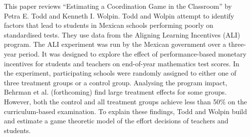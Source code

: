 
This paper reviews “Estimating a Coordination Game in the Classroom” by Petra E. Todd and Kenneth I. Wolpin. Todd and Wolpin attempt to identify factors that lead to students in Mexican schools performing poorly on standardised tests. They use data from the Aligning Learning Incentives (ALI) program. The ALI experiment was run by the Mexican government over a three- year period. It was designed to explore the effect of performance-based monetary incentives for students and teachers on end-of-year mathematics test scores. In the experiment, participating schools were randomly assigned to either one of three treatment groups or a control group.
Analysing the program impact, Behrman et al. (forthcoming) find large treatment effects for some groups. However, both the control and all treatment groups achieve less than 50\% on the curriculum-based examination. To explain these findings, Todd and Wolpin build and estimate a game theoretic model of the effort decisions of teachers and students. 